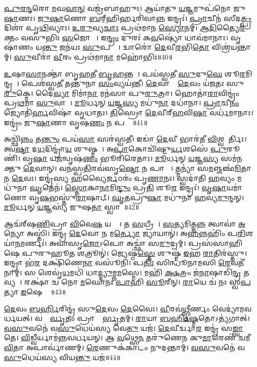 \ul{𑌪𑍁}\ul{𑌰}\ul{𑌨𑍍𑌦}𑌰𑍋 \ul{𑌮}𑌘\ul{𑌵𑌾}\ul{𑌨𑍍} 𑌵𑌜𑍍𑌰॑𑌬𑌾𑌹𑍁𑌃।
𑌆𑌯𑌾॑𑌤𑍁 \ul{𑌯}𑌜𑍍𑌞𑌮𑍁𑌪॑𑌨𑍋 𑌜𑍁\ul{𑌷𑌾}𑌣𑌃।
\ul{𑌜𑍁}\ul{𑌷𑌾}𑌣𑍋 \ul{𑌬}𑌰𑍍‌॒\mbox{}𑌹𑌿𑌰𑍍\mbox{}𑌹𑌰𑌿॑𑌵𑌾\ul{𑌨𑍍𑌨} 𑌇𑌨𑍍𑌦𑍍𑌰𑌃॑।
\ul{𑌪𑍍𑌰𑌾}𑌚𑍀𑌨॑ 𑌸𑍀𑌦\ul{𑌤𑍍𑌪𑍍𑌰}𑌦𑌿𑌶𑌾॑ 𑌪𑍃\ul{𑌥𑌿}𑌵𑍍𑌯𑌾𑌃।
\ul{𑌉}\ul{𑌰𑍁}𑌵𑍍𑌯\ul{𑌚𑌾𑌃} 𑌪𑍍𑌰𑌥॑𑌮𑌾𑌨 \ul{𑌸𑍍𑌯𑍋}𑌨𑌮𑍍।
\ul{𑌆}\ul{𑌦𑌿}𑌤𑍍𑌯𑍈\ul{𑌰}𑌕𑍍𑌤𑌂 𑌵𑌸𑍁॑𑌭𑌿𑌃 \ul{𑌸}𑌜𑍋𑌷𑌾𑌃᳚।
𑌇\ul{𑌨𑍍𑌦𑍍𑌰𑌂} 𑌦𑍁𑌰𑌃॑ 𑌕\ul{𑌵}𑌷𑍍𑌯𑍋॑ 𑌧𑌾𑌵॑𑌮𑌾𑌨𑌾𑌃।
𑌵𑍃𑌷𑌾॑𑌣𑌂 𑌯\ul{𑌨𑍍𑌤𑍁} 𑌜𑌨॑𑌯𑌃 \ul{𑌸𑍁}𑌪𑌤𑍍𑌨𑍀𑌃᳚।
𑌦𑍍𑌵𑌾𑌰𑍋॑ \ul{𑌦𑍇}𑌵𑍀\ul{𑌰}𑌭𑌿\ul{𑌤𑍋} 𑌵𑌿𑌶𑍍𑌰॑𑌯𑌨𑍍𑌤𑌾𑌮𑍍।
\ul{𑌸𑍁}𑌵𑍀𑌰𑌾॑ \ul{𑌵𑍀}𑌰𑌂 𑌪𑍍𑌰𑌥॑𑌮𑌾\ul{𑌨𑌾} 𑌮𑌹𑍋॑𑌭𑌿𑌃॥40॥

\ul{𑌉}𑌷𑌾\ul{𑌸𑌾}𑌨𑌕𑍍𑌤𑌾॑ 𑌬𑍃\ul{𑌹}𑌤𑍀 \ul{𑌬𑍃}𑌹𑌨𑍍𑌤𑌮𑍍᳚।
𑌪𑌯॑𑌸𑍍𑌵𑌤𑍀 \ul{𑌸𑍁}𑌦𑍁\ul{𑌘𑍇} 𑌶𑍂\ul{𑌰}𑌮𑌿𑌨𑍍𑌦𑍍𑌰𑌮𑍍᳚।
𑌪𑍇𑌶॑𑌸𑍍𑌵\ul{𑌤𑍀} 𑌤𑌨𑍍𑌤𑍁॑𑌨𑌾 \ul{𑌸𑌂}𑌵𑍍𑌯𑌯॑𑌨𑍍𑌤𑍀।
\ul{𑌦𑍇}𑌵𑌾𑌨𑌾𑌂᳚ \ul{𑌦𑍇}𑌵𑌂 𑌯॑𑌜𑌤𑌃 𑌸𑍁\ul{𑌰𑍁}𑌕𑍍𑌮𑍇।
𑌦𑍈\ul{𑌵𑍍𑌯𑌾} 𑌮𑌿𑌮𑌾॑\ul{𑌨𑌾} 𑌮𑌨॑𑌸𑌾 𑌪𑍁\ul{𑌰𑍁}𑌤𑍍𑌰𑌾।
𑌹𑍋𑌤𑌾॑\ul{𑌰𑌾}𑌵𑌿𑌨𑍍𑌦𑍍𑌰𑌂॑ 𑌪𑍍𑌰\ul{𑌥}𑌮𑌾 \ul{𑌸𑍁}𑌵𑌾𑌚𑌾᳚।
\ul{𑌮𑍂}𑌰𑍍𑌧𑌨𑍍 \ul{𑌯}𑌜𑍍𑌞\ul{𑌸𑍍𑌯} 𑌮𑌧𑍁॑\ul{𑌨𑌾} 𑌦𑌧𑌾॑𑌨𑌾।
\ul{𑌪𑍍𑌰𑌾}𑌚𑍀\ul{𑌨𑌂} 𑌜𑍍𑌯𑍋𑌤𑌿॑\ul{𑌰𑍍𑌹}𑌵𑌿𑌷𑌾॑ 𑌵𑍃𑌧𑌾𑌤𑌃।
\ul{𑌤𑌿}𑌸𑍍𑌰𑍋 \ul{𑌦𑍇}𑌵𑍀𑌰𑍍‌\mbox{}\ul{𑌹}𑌵𑌿\ul{𑌷𑌾} 𑌵𑌰𑍍𑌧॑𑌮𑌾𑌨𑌾𑌃।
𑌇𑌨𑍍𑌦𑍍𑌰𑌂॑ 𑌜𑍁\ul{𑌷𑌾}𑌣𑌾 𑌵𑍃𑌷॑\ul{𑌣𑌂} 𑌨 𑌪𑌤𑍍𑌨𑍀𑌃᳚॥41॥

𑌅𑌚𑍍𑌛𑌿॑\ul{𑌨𑍍𑌨𑌂} 𑌤\ul{𑌨𑍍𑌤𑍁𑌂} 𑌪𑌯॑\ul{𑌸𑌾} 𑌸𑌰॑𑌸𑍍𑌵𑌤𑍀।
𑌇𑌡𑌾॑ \ul{𑌦𑍇}𑌵𑍀 𑌭𑌾𑌰॑𑌤𑍀 \ul{𑌵𑌿}𑌶𑍍𑌵𑌤𑍂᳚𑌰𑍍𑌤𑌿𑌃।
𑌤𑍍𑌵\ul{𑌷𑍍𑌟𑌾} 𑌦\ul{𑌧}𑌦𑌿𑌨𑍍𑌦𑍍𑌰𑌾॑\ul{𑌯} 𑌶𑍁𑌷𑍍𑌮𑌮𑍍᳚।
𑌅\ul{𑌪𑌾}𑌕𑍋𑌚𑌿॑𑌷𑍍𑌟𑍁\ul{𑌰𑍍𑌯}𑌶𑌸𑍇॑ \ul{𑌪𑍁}𑌰𑍂𑌣𑌿॑।
𑌵𑍃\ul{𑌷𑌾} 𑌯\ul{𑌜}𑌨𑍍𑌵𑍃𑌷॑\ul{𑌣𑌂} 𑌭𑍂𑌰𑌿॑𑌰𑍇𑌤𑌾𑌃।
\ul{𑌮𑍂}𑌰𑍍𑌧𑌨𑍍 \ul{𑌯}𑌜𑍍𑌞\ul{𑌸𑍍𑌯} 𑌸𑌮॑𑌨𑌕𑍍𑌤𑍁 \ul{𑌦𑍇}𑌵𑌾𑌨𑍍।
𑌵\ul{𑌨}𑌸𑍍𑌪\ul{𑌤𑌿}𑌰𑌵॑𑌸𑍃\ul{𑌷𑍍𑌟𑍋} 𑌨 𑌪𑌾𑌶𑍈𑌃᳚।
𑌤𑍍𑌮𑌨𑍍𑌯𑌾॑ 𑌸\ul{𑌮}𑌞𑍍𑌜𑌞𑍍𑌛॑\ul{𑌮𑌿}𑌤𑌾 𑌨 \ul{𑌦𑍇}𑌵𑌃।
𑌇𑌨𑍍𑌦𑍍𑌰॑𑌸𑍍𑌯 \ul{𑌹}𑌵𑍍𑌯𑍈\ul{𑌰𑍍𑌜}𑌠𑌰𑌂॑ 𑌪𑍃\ul{𑌣𑌾}𑌨𑌃।
𑌸𑍍𑌵𑌦𑌾॑𑌤𑌿 \ul{𑌹}𑌵𑍍𑌯𑌂 𑌮𑌧𑍁॑𑌨𑌾 \ul{𑌘𑍃}𑌤𑍇𑌨॑।
\ul{𑌸𑍍𑌤𑍋}𑌕𑌾\ul{𑌨𑌾}𑌮𑌿\ul{𑌨𑍍𑌦𑍁𑌂} 𑌪𑍍𑌰\ul{𑌤𑌿} 𑌶𑍂\ul{𑌰} 𑌇𑌨𑍍𑌦𑍍𑌰𑌃॑।
\ul{𑌵𑍃}\ul{𑌷𑌾}𑌯𑌮𑌾॑𑌣𑍋 𑌵𑍃\ul{𑌷}𑌭𑌸𑍍𑌤𑍁॑\ul{𑌰𑌾}𑌷𑌾𑌟𑍍।
\ul{𑌘𑍃}\ul{𑌤}𑌪𑍍𑌰𑍁\ul{𑌷𑌾} 𑌮𑌧𑍁॑𑌨𑌾 \ul{𑌹}𑌵𑍍𑌯\ul{𑌮𑍁}𑌨𑍍𑌦𑌨𑍍।
\ul{𑌮𑍂}𑌰𑍍𑌧𑌨𑍍 \ul{𑌯}𑌜𑍍𑌞𑌸𑍍𑌯॑ 𑌜𑍁𑌷\ul{𑌤𑌾}\ul{} 𑌸𑍍𑌵𑌾𑌹𑌾᳚॥42॥\anuvakamend[𑌶𑌰𑍍𑌧॑𑌮𑌾\ul{𑌨𑍋} 𑌮𑌹𑍋॑\ul{𑌭𑌿𑌃} 𑌪𑌤𑍍𑌨𑍀᳚\ul{𑌰𑍍𑌘𑍃}𑌤𑍇𑌨॑ \ul{𑌚}𑌤𑍍𑌵𑌾𑌰𑌿॑ 𑌚]

𑌆𑌚॑𑌰𑍍‌\mbox{}𑌷\ul{𑌣𑌿}𑌪𑍍𑌰𑌾 \ul{𑌵𑌿}𑌵𑍇\ul{𑌷} 𑌯𑌨𑍍𑌮𑌾᳚।
𑌤 \ul{𑌸}𑌧𑍍𑌰𑍀𑌚𑍀𑌃᳚।
\ul{𑌸}𑌤𑍍𑌯𑌮𑌿𑌤𑍍𑌤𑌨𑍍𑌨 𑌤𑍍𑌵𑌾𑌵𑌾॑ \ul{𑌅}𑌨𑍍𑌯𑍋 𑌅𑌸𑍍𑌤𑌿॑।
𑌇𑌨𑍍𑌦𑍍𑌰॑ \ul{𑌦𑍇}𑌵𑍋 𑌨 𑌮\ul{𑌰𑍍𑌤𑍍𑌯𑍋} 𑌜𑍍𑌯𑌾𑌯𑌾𑌨𑍍॑।
𑌅\ul{𑌹}𑌨𑍍𑌨𑌹𑌿𑌂॑ 𑌪\ul{𑌰𑌿}𑌶𑌯𑌾॑\ul{𑌨}𑌮𑌰𑍍𑌣𑌃॑।
𑌅𑌵𑌾॑𑌸𑍃\ul{𑌜𑍋}𑌽𑌪𑍋 𑌅𑌚𑍍𑌛𑌾॑ 𑌸\ul{𑌮𑍁}𑌦𑍍𑌰𑌮𑍍।
𑌪𑍍𑌰𑌸॑𑌸𑌾𑌹𑌿𑌷𑍇 𑌪𑍁𑌰𑍁𑌹𑍂\ul{𑌤} 𑌶𑌤𑍍𑌰𑍂𑌨𑍍॑।
𑌜𑍍𑌯𑍇𑌷𑍍𑌠॑\ul{𑌸𑍍𑌤𑍇} 𑌶𑍁𑌷𑍍𑌮॑ \ul{𑌇}𑌹 \ul{𑌰𑌾}𑌤𑌿𑌰॑𑌸𑍍𑌤𑍁।
𑌇𑌨𑍍𑌦𑍍𑌰𑌾 𑌭॑\ul{𑌰} 𑌦𑌕𑍍𑌷𑌿॑𑌣𑍇\ul{𑌨𑌾} 𑌵𑌸𑍂॑𑌨𑌿।
𑌪\ul{𑌤𑌿𑌃} 𑌸𑌿𑌨𑍍𑌧𑍂॑𑌨𑌾𑌮𑌸𑌿 \ul{𑌰𑍇}𑌵𑌤𑍀॑𑌨𑌾𑌮𑍍।
𑌸 𑌶𑍇𑌵𑍃॑\ul{𑌧}𑌮𑌧𑌿॑ 𑌧𑌾\ul{𑌦𑍍𑌦𑍍𑌯𑍁}𑌮𑍍𑌨\ul{𑌮}𑌸𑍍𑌮𑍇।
𑌮𑌹𑌿॑ \ul{𑌕𑍍𑌷}𑌤𑍍𑌰𑌂 𑌜॑\ul{𑌨𑌾}𑌷𑌾𑌡𑌿॑\ul{𑌨𑍍𑌦𑍍𑌰} 𑌤𑌵𑍍𑌯𑌮𑍍᳚।
𑌰𑌕𑍍𑌷𑌾॑ 𑌚 𑌨𑍋 \ul{𑌮}𑌘𑍋𑌨𑌃॑ \ul{𑌪𑌾}𑌹𑌿 \ul{𑌸𑍂}𑌰𑍀𑌨𑍍।
\ul{𑌰𑌾}𑌯𑍇 𑌚॑ 𑌨𑌃 𑌸𑍍𑌵\ul{𑌪}𑌤𑍍𑌯𑌾 \ul{𑌇}𑌷𑍇 𑌧𑌾𑌃᳚॥43॥\anuvakamend[\ul{𑌰𑍇}𑌵𑌤𑍀॑𑌨𑌾𑌂 \ul{𑌚}𑌤𑍍𑌵𑌾𑌰𑌿॑ 𑌚]

\ul{𑌦𑍇}𑌵𑌂 \ul{𑌬}\ul{𑌰𑍍}𑌹𑌿𑌰𑌿𑌨𑍍𑌦𑍍𑌰॑ 𑌸𑍁\ul{𑌦𑍇}𑌵𑌂 \ul{𑌦𑍇}𑌵𑍈𑌃।
\ul{𑌵𑍀}𑌰𑌵॑\ul{𑌥𑍍𑌸𑍍𑌤𑍀}𑌰𑍍𑌣𑌂 𑌵𑍇𑌦𑍍𑌯𑌾॑𑌮𑌵𑌰𑍍𑌧𑌯𑌤𑍍।
𑌵𑌸𑍍𑌤𑍋᳚\ul{𑌰𑍍𑌵𑍃}𑌤𑌂 𑌪𑍍𑌰𑌾𑌕𑍍𑌤𑍋᳚\ul{𑌰𑍍𑌭𑍃}𑌤𑌮𑍍।
\ul{𑌰𑌾}𑌯𑌾 \ul{𑌬}\ul{𑌰𑍍}𑌹𑌿\ul{𑌷𑍍𑌮}𑌤𑍋\-𑌽𑌤𑍍𑌯॑𑌗𑌾𑌤𑍍।
\ul{𑌵}\ul{𑌸𑍁}𑌵𑌨𑍇॑ 𑌵\ul{𑌸𑍁}𑌧𑍇𑌯॑𑌸𑍍𑌯 𑌵𑍇\ul{𑌤𑍁} 𑌯𑌜॑।
\ul{𑌦𑍇}𑌵𑍀𑌰𑍍𑌦𑍍𑌵𑌾\ul{𑌰} 𑌇𑌨𑍍𑌦𑍍𑌰॑ 𑌸\ul{𑌙𑍍𑌘𑌾}𑌤𑍇।
\ul{𑌵𑌿}𑌡𑍍𑌵𑍀𑌰𑍍𑌯𑌾𑌮॑𑌨𑍍𑌨𑌵𑌰𑍍𑌧𑌯𑌨𑍍।
𑌆 \ul{𑌵}𑌥𑍍𑌸𑍇\ul{𑌨} 𑌤𑌰𑍁॑𑌣𑍇𑌨 𑌕𑍁\ul{𑌮𑌾}𑌰𑍇𑌣॑ 𑌚𑌮𑍀\ul{𑌵𑌿}𑌤𑌾 𑌅𑌪𑌾𑌰𑍍𑌵𑌾॑𑌣𑌮𑍍।
\ul{𑌰𑍇}𑌣𑍁𑌕॑𑌕𑌾𑌟𑌂 𑌨𑍁𑌦𑌨𑍍𑌤𑌾𑌮𑍍।
\ul{𑌵}\ul{𑌸𑍁}𑌵𑌨𑍇॑ 𑌵\ul{𑌸𑍁}𑌧𑍇𑌯॑𑌸𑍍𑌯 𑌵𑌿𑌯\ul{𑌨𑍍𑌤𑍁} 𑌯𑌜॑॥44॥

